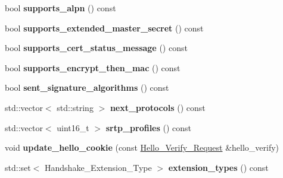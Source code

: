 \begin{DoxyCompactItemize}
bool {\bfseries supports\+\_\+alpn} () const
\item 
\mbox{\label{class_botan_1_1_t_l_s_1_1_client___hello_abc7528347bb52609aca8b3647283049c}} 
bool {\bfseries supports\+\_\+extended\+\_\+master\+\_\+secret} () const
\item 
\mbox{\label{class_botan_1_1_t_l_s_1_1_client___hello_a5979db068cee155cb7265c9192228f20}} 
bool {\bfseries supports\+\_\+cert\+\_\+status\+\_\+message} () const
\item 
\mbox{\label{class_botan_1_1_t_l_s_1_1_client___hello_ac80096d2ae6b8476d0c4ced2f301fe9f}} 
bool {\bfseries supports\+\_\+encrypt\+\_\+then\+\_\+mac} () const
\item 
\mbox{\label{class_botan_1_1_t_l_s_1_1_client___hello_a3cf910f1f672362e50fd4cda8c1bf9fc}} 
bool {\bfseries sent\+\_\+signature\+\_\+algorithms} () const
\item 
\mbox{\label{class_botan_1_1_t_l_s_1_1_client___hello_a8f7181a5ec21e87c92d1b63d56899c7d}} 
std\+::vector$<$ std\+::string $>$ {\bfseries next\+\_\+protocols} () const
\item 
\mbox{\label{class_botan_1_1_t_l_s_1_1_client___hello_ad10a75a0735c7533468ea26faa25c6ae}} 
std\+::vector$<$ uint16\+\_\+t $>$ {\bfseries srtp\+\_\+profiles} () const
\item 
\mbox{\label{class_botan_1_1_t_l_s_1_1_client___hello_aa4ce0efb4da5c07822f714557a84c28a}} 
void {\bfseries update\+\_\+hello\+\_\+cookie} (const \mbox{\hyperlink{class_botan_1_1_t_l_s_1_1_hello___verify___request}{Hello\+\_\+\+Verify\+\_\+\+Request}} \&hello\+\_\+verify)
\item 
\mbox{\label{class_botan_1_1_t_l_s_1_1_client___hello_a9ff6a4f09fc7a26a63c3ce985cf51d03}} 
std\+::set$<$ Handshake\+\_\+\+Extension\+\_\+\+Type $>$ {\bfseries extension\+\_\+types} () const
\item 

\end{DoxyCompactItemize}
